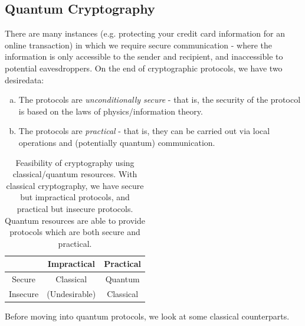 \subsection{Quantum Cryptography}
There are many instances (e.g. protecting your credit card information for an online transaction) in which we require secure communication - where the information is only accessible to the sender and recipient, and inaccessible to potential eavesdroppers. On the end of cryptographic protocols, we have two desiredata:
\begin{enumerate}[(a)]
    \item The protocols are \emph{unconditionally secure} - that is, the security of the protocol is based on the laws of physics/information theory.
    \item The protocols are \emph{practical} - that is, they can be carried out via local operations and (potentially quantum) communication.
\end{enumerate} 

\begin{table}[htbp]
    \centering\begin{tabular}{|c|c|c|}
        \hline & Impractical & Practical
        \\ \hline Secure & Classical & Quantum
        \\ \hline Insecure & (Undesirable) & Classical
        \\ \hline
    \end{tabular}
    \caption{Feasibility of cryptography using classical/quantum resources. With classical cryptography, we have secure but impractical protocols, and practical but insecure protocols. Quantum resources are able to provide protocols which are both secure and practical.}
    \label{fig-cryptography}
\end{table}

Before moving into quantum protocols, we look at some classical counterparts.

